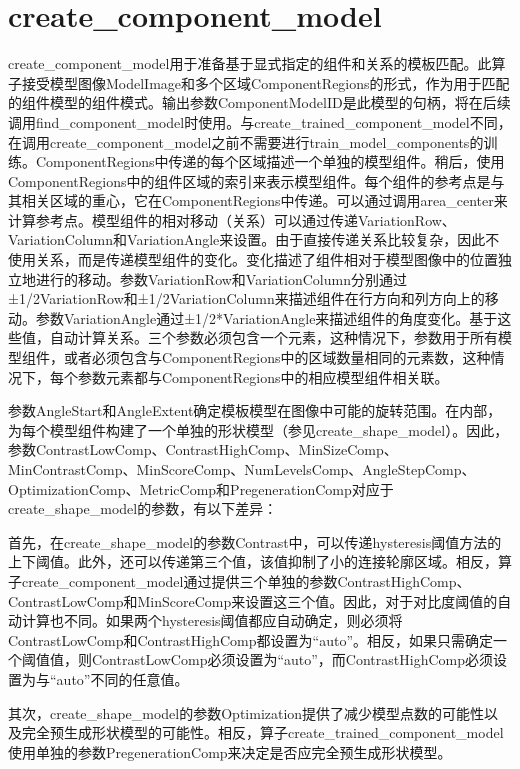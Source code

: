 \documentclass{article}
\begin{document}
\section{create\_component\_model}
create\_component\_model用于准备基于显式指定的组件和关系的模板匹配。此算子接受模型图像ModelImage和多个区域ComponentRegions的形式，作为用于匹配的组件模型的组件模式。输出参数ComponentModelID是此模型的句柄，将在后续调用find\_component\_model时使用。与create\_trained\_component\_model不同，在调用create\_component\_model之前不需要进行train\_model\_components的训练。ComponentRegions中传递的每个区域描述一个单独的模型组件。稍后，使用ComponentRegions中的组件区域的索引来表示模型组件。每个组件的参考点是与其相关区域的重心，它在ComponentRegions中传递。可以通过调用area\_center来计算参考点。模型组件的相对移动（关系）可以通过传递VariationRow、VariationColumn和VariationAngle来设置。由于直接传递关系比较复杂，因此不使用关系，而是传递模型组件的变化。变化描述了组件相对于模型图像中的位置独立地进行的移动。参数VariationRow和VariationColumn分别通过±1/2VariationRow和±1/2VariationColumn来描述组件在行方向和列方向上的移动。参数VariationAngle通过±1/2*VariationAngle来描述组件的角度变化。基于这些值，自动计算关系。三个参数必须包含一个元素，这种情况下，参数用于所有模型组件，或者必须包含与ComponentRegions中的区域数量相同的元素数，这种情况下，每个参数元素都与ComponentRegions中的相应模型组件相关联。

参数AngleStart和AngleExtent确定模板模型在图像中可能的旋转范围。在内部，为每个模型组件构建了一个单独的形状模型（参见create\_shape\_model）。因此，参数ContrastLowComp、ContrastHighComp、MinSizeComp、MinContrastComp、MinScoreComp、NumLevelsComp、AngleStepComp、OptimizationComp、MetricComp和PregenerationComp对应于create\_shape\_model的参数，有以下差异：

首先，在create\_shape\_model的参数Contrast中，可以传递hysteresis阈值方法的上下阈值。此外，还可以传递第三个值，该值抑制了小的连接轮廓区域。相反，算子create\_component\_model通过提供三个单独的参数ContrastHighComp、ContrastLowComp和MinScoreComp来设置这三个值。因此，对于对比度阈值的自动计算也不同。如果两个hysteresis阈值都应自动确定，则必须将ContrastLowComp和ContrastHighComp都设置为“auto”。相反，如果只需确定一个阈值值，则ContrastLowComp必须设置为“auto”，而ContrastHighComp必须设置为与“auto”不同的任意值。

其次，create\_shape\_model的参数Optimization提供了减少模型点数的可能性以及完全预生成形状模型的可能性。相反，算子create\_trained\_component\_model使用单独的参数PregenerationComp来决定是否应完全预生成形状模型。
\end{document}
